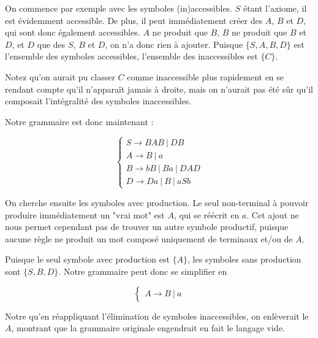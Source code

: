 \begin{correction*}

On commence par exemple avec les symboles (in)accessibles. $S$ étant l'axiome, il est évidemment accessible. De plus, il peut immédiatement créer des $A$, $B$ et $D$, qui sont donc également accessibles. $A$ ne produit que $B$, $B$ ne produit que $B$ et $D$, et $D$ que des $S$, $B$ et $D$, on n'a donc rien à ajouter. Puisque $\{S,A,B,D\}$ est l'ensemble des symboles accessibles, l'ensemble des inaccessibles est $\{C\}$.

Notez qu'on aurait pu classer $C$ comme inaccessible plus rapidement en se rendant compte qu'il n'apparaît jamais à droite, mais on n'aurait pas été sûr qu'il composait l'intégralité des symboles inaccessibles.

Notre grammaire est donc maintenant :

\[
\begin{cases}
S \rightarrow BAB~|~DB \\
A \rightarrow B~|~a \\
B \rightarrow bB~|~Ba~|~DAD \\
D \rightarrow Da~|~B~|~aSb
\end{cases}
\]

On cherche ensuite les symboles avec production. Le seul non-terminal à pouvoir produire immédiatement un "vrai mot" est $A$, qui se réécrit en $a$. Cet ajout ne nous permet cependant pas de trouver un autre symbole productif, puisque aucune règle ne produit un mot composé uniquement de terminaux et/ou de $A$.

Puisque le seul symbole avec production est $\{A\}$, les symboles sans production sont $\{S,B,D\}$. Notre grammaire peut donc se simplifier en 


\[
\begin{cases}
A \rightarrow B~|~a 
\end{cases}
\]

Notre qu'en réappliquant l'élimination de symboles inaccessibles, on enlèverait le $A$, montrant que la grammaire originale engendrait en fait le langage vide.

\end{correction*}


